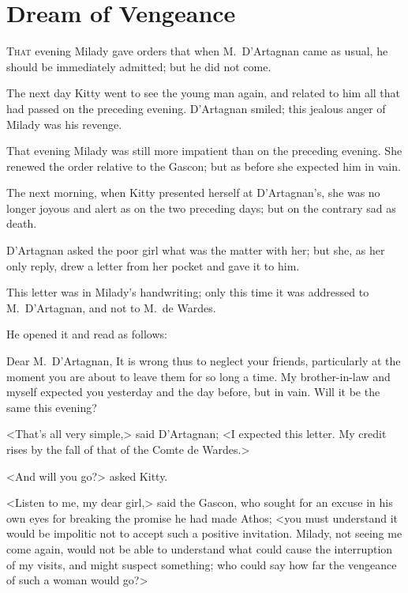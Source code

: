 
\chapter{Dream of Vengeance}

\lettrine{T}{hat} evening Milady gave orders that when M.~D'Artagnan came as usual, he should be immediately admitted; but he did not come. 

\zz
The next day Kitty went to see the young man again, and related to him all that had passed on the preceding evening. D'Artagnan smiled; this jealous anger of Milady was his revenge. 

That evening Milady was still more impatient than on the preceding evening. She renewed the order relative to the Gascon; but as before she expected him in vain. 

The next morning, when Kitty presented herself at D'Artagnan's, she was no longer joyous and alert as on the two preceding days; but on the contrary sad as death. 

D'Artagnan asked the poor girl what was the matter with her; but she, as her only reply, drew a letter from her pocket and gave it to him. 

This letter was in Milady's handwriting; only this time it was addressed to M.~D'Artagnan, and not to M.~de Wardes. 

He opened it and read as follows: 
\begin{letter}
\vspace{-1em}
\end{letter}
\begin{a4}
\vspace{-1.5em}
\enlargethispage{\baselineskip}
\end{a4}
\begin{mail}{}{Dear M.~D'Artagnan,}
It is wrong thus to neglect your friends, particularly at the moment you are about to leave them for so long a time. My brother-in-law and myself expected you yesterday and the day before, but in vain. Will it be the same this evening? 

\end{mail}

<That's all very simple,> said D'Artagnan; <I expected this letter. My credit rises by the fall of that of the Comte de Wardes.> 

<And will you go?> asked Kitty. 

<Listen to me, my dear girl,> said the Gascon, who sought for an excuse in his own eyes for breaking the promise he had made Athos; <you must understand it would be impolitic not to accept such a positive invitation. Milady, not seeing me come again, would not be able to understand what could cause the interruption of my visits, and might suspect something; who could say how far the vengeance of such a woman would go?> 

